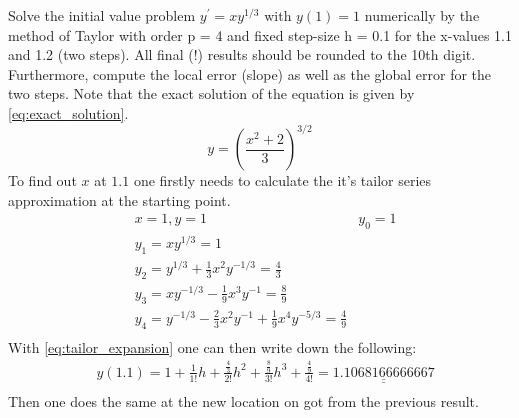 Solve the initial value problem $y^{\prime}=x y^{1 / 3} \text{ with }  y(1)=1$ numerically by the method of Taylor with order p = 4 and fixed step-size h = 0.1 for the x-values 1.1 and 1.2 (two steps). All final (!) results should be rounded to the 10th digit. Furthermore, compute the local error (slope) as well as the global error for the two steps. Note that the exact solution of the equation is given by \autoref{eq:exact_solution}.
\begin{equation}\label{eq:exact_solution}
y=\left(\frac{x^2+2}{3}\right)^{3 / 2}
\end{equation}\newline
To find out $x$ at $1.1$ one firstly needs to calculate the it's tailor series approximation at the starting point.
$$
\begin{aligned}
&x=1, y=1
&y_0=1 \\
&y_1= x y^{1 / 3}=1\\
&y_2=y^{1 / 3}+\frac{1}{3} x^2 y^{-1 / 3}=\frac{4}{3} \\
&y_3=x y^{-1 / 3}-\frac{1}{9} x^3 y^{-1}=\frac{8}{9} \\
&y_4=y^{-1 / 3}-\frac{2}{3} x^2 y^{-1}+\frac{1}{9} x^4 y^{-5 / 3}=\frac{4}{9} \\
\end{aligned}
$$
With \autoref{eq:tailor_expansion} one can then write down the following:
$$
\begin{aligned}
&y(1.1)= 1+\frac{1}{1 !} h+\frac{\frac{4}{3}}{2 !} h^2+\frac{\frac{8}{9}}{3 !} h^3+\frac{\frac{4}{9}}{4 !}=\underline{\underline{1.1068166666667}}\\
\end{aligned}
$$
Then one does the same at the new location on got from the previous result.

